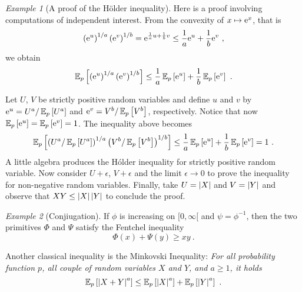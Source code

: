 \documentclass[12pt,a4paper]{amsart}
\theoremstyle{plain}%
\theoremstyle{definition}
\theoremstyle{remark}
\newtheorem{example}{Example}
\begin{document}
\begin{example}[A proof of the H\"older inequality]
  Here is a proof involving computations of independent interest. From the convexity of $x \mapsto \mathrm{e}^x$, that is
\begin{equation*}
  \left(\mathrm{e}^u\right)^{1/a} \left(\mathrm{e}^v\right)^{1/b} = \mathrm{e}^{\frac1a u + \frac1b v} \leq \frac1a \mathrm{e}^u + \frac1b \mathrm{e}^v \ , 
\end{equation*}
we obtain
\begin{equation*}
  \operatorname{\mathbb E}_{p}\left[\left(\mathrm{e}^u\right)^{1/a} \left(\mathrm{e}^v\right)^{1/b}\right] \leq \frac1a \operatorname{\mathbb E}_{p}\left[\mathrm{e}^u\right] + \frac1b \operatorname{\mathbb E}_{p}\left[\mathrm{e}^v\right] \ .
\end{equation*}

Let $U$, $V$ be strictly positive random variables and define $u$ and $v$ by $\mathrm{e}^u = U^a / \operatorname{\mathbb E}_{p}\left[U^a\right]$ and $\mathrm{e}^v = V^b / \operatorname{\mathbb E}_{p}\left[V^b\right]$, respectively. Notice that now $\operatorname{\mathbb E}_{p}\left[\mathrm{e}^u\right] = \operatorname{\mathbb E}_{p}\left[\mathrm{e}^v\right] = 1$. The inequality above becomes
\begin{equation*}
  \expectat p {\left(U^a / \expectat p {U^a}\right)^{1/a} \left(V^b / \expectat p {V^b}\right)^{1/b}} \leq \frac1a \expectat p {\euler^u} + \frac1b \expectat p {\euler^v} = 1\ .
\end{equation*}
A little algebra produces the H\'older inequality for strictly positive random variable. Now consider $U + \epsilon$, $V+\epsilon$ and the limit $\epsilon\to0$ to prove the inequality for non-negative random variables. Finally, take $U = \left\vert X\right\vert$ and $V = \left\vert Y\right\vert$ and observe that $XY \leq \left\vert X\right\vert \left\vert Y\right\vert$ to conclude the proof.
\end{example}

\begin{example}[Conjiugation]
If $\phi$ is increasing on $[0,\infty[$ and $\psi=\phi^{-1}$, then the two primitives $\Phi$ and $\Psi$ satisfy the Fentchel inequality
\begin{equation*}
    \Phi(x) + \Psi(y) \geq xy \ .
\end{equation*}
\end{example}

Another classical inequality is the Minkovski Inequality: \emph{For all probability function $p$, all couple of random variables $X$ and $Y$, and $a \geq 1$, it holds}
\begin{equation*}
  \expectat p {\aval{X+Y}^a} \leq \expectat p {\aval{X}^a} + \expectat p {\aval{Y}^a} \ . 
\end{equation*}
\end{document}
